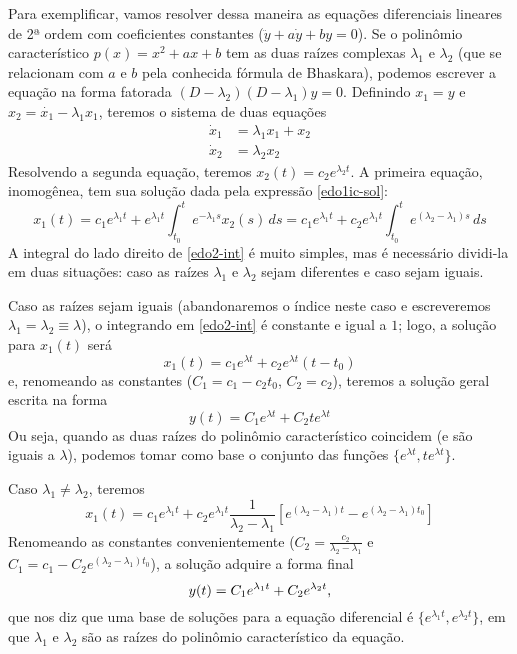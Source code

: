 \documentclass[12pt,a4paper,oneside]{memoir}
\begin{document}
Para exemplificar, vamos resolver dessa maneira as equações diferenciais lineares de 2ª ordem com coeficientes constantes ($\ddot{y} + a \dot{y} + by = 0$).  Se o polinômio característico $p(x) = x^2 + ax + b$ tem as duas raízes complexas $\lambda_1$ e $\lambda_2$ (que se relacionam com $a$ e $b$ pela conhecida fórmula de Bhaskara), podemos escrever a equação na forma fatorada $(D - \lambda_2)(D - \lambda_1)y = 0$.  Definindo $x_1 = y$ e $x_2 = \dot{x_1} - \lambda_1 x_1$, teremos o sistema de duas equações
\begin{equation}
  \begin{aligned}
    \dot{x}_1 &= \lambda_1 x_1 + x_2 \\
    \dot{x}_2 &= \lambda_2 x_2
  \end{aligned}
\end{equation}
Resolvendo a segunda equação, teremos $x_2(t) = c_2 e^{\lambda_2 t}$.  A primeira equação, inomogênea, tem sua solução dada pela expressão \eqref{edo1ic-sol}:
\begin{equation}
\label{edo2-int}
  x_1(t)
  = c_1 e^{\lambda_1 t}
    + e^{\lambda_1 t} \int_{t_0}^{t}
        e^{-\lambda_1 s} x_2(s)\,ds
  = c_1 e^{\lambda_1 t}
    + c_2 e^{\lambda_1 t} \int_{t_0}^{t}
        e^{(\lambda_2 - \lambda_1) s}\,ds
\end{equation}
A integral do lado direito de \eqref{edo2-int} é muito simples, mas é necessário dividi-la em duas situações: caso as raízes $\lambda_1$ e $\lambda_2$ sejam diferentes e caso sejam iguais.

Caso as raízes sejam iguais (abandonaremos o índice neste caso e escreveremos $\lambda_1 = \lambda_2 \equiv \lambda$), o integrando em \eqref{edo2-int} é constante e igual a $1$; logo, a solução para $x_1(t)$ será
\[
  x_1(t)
  = c_1 e^{\lambda t}
    + c_2 e^{\lambda t} (t - t_0)
\]
e, renomeando as constantes ($C_1 = c_1 - c_2 t_0$, $C_2 = c_2$), teremos a solução geral escrita na forma
\begin{equation}
\label{edo2-sol-igu}
  y(t) = C_1 e^{\lambda t} + C_2 t e^{\lambda t}
\end{equation}
Ou seja, quando as duas raízes do polinômio característico coincidem (e são iguais a $\lambda$), podemos tomar como base o conjunto das funções $\{e^{\lambda t}, te^{\lambda t}\}$.

Caso $\lambda_1 \neq \lambda_2$, teremos
\[
  x_1(t)
  = c_1 e^{\lambda_1 t}
    + c_2 e^{\lambda_1 t} \frac{1}{\lambda_2 - \lambda_1}
      \left[
        e^{(\lambda_2 - \lambda_1) t}
        - e^{(\lambda_2 - \lambda_1) t_0}
      \right]
\]
Renomeando as constantes convenientemente ($C_2 = \frac{c_2}{\lambda_2 - \lambda_1}$ e $C_1 = c_1 - C_2 e^{(\lambda_2 - \lambda_1) t_0}$), a solução adquire a forma final
\begin{equation}
\label{edo2-sol-dist}
  y(t) = C_1 e^{\lambda_1 t} + C_2 e^{\lambda_2 t} \text,
\end{equation}
que nos diz que uma base de soluções para a equação diferencial é $\{e^{\lambda_1 t}, e^{\lambda_2 t}\}$, em que $\lambda_1$ e $\lambda_2$ são as raízes do polinômio característico da equação.
\end{document}
